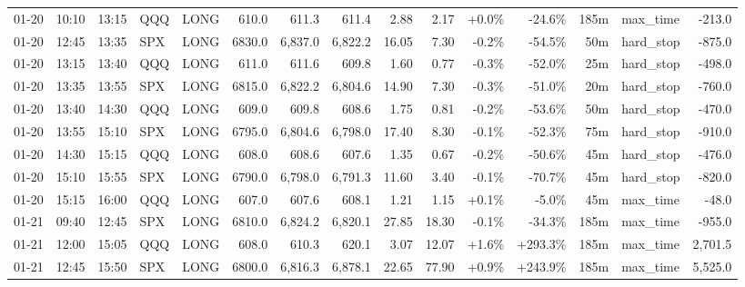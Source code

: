 \documentclass[11pt,a4paper,twoside]{article}
\begin{document}
\begin{landscape}
\begin{center}
\begin{longtable}{>{\color{txtmain}}l l l l l r r r r r r r r >{\color{txtmain}}l r}
01-20 & 10:10 & 13:15 & QQQ & LONG & 610.0 & 611.3 & 611.4 & 2.88 & 2.17 & \textcolor{wingreen}{+0.0\%} & \textcolor{lossred}{-24.6\%} & 185m & max\_time & \textcolor{lossred}{-213.0} \\
01-20 & 12:45 & 13:35 & SPX & LONG & 6830.0 & 6,837.0 & 6,822.2 & 16.05 & 7.30 & \textcolor{lossred}{-0.2\%} & \textcolor{lossred}{-54.5\%} & 50m & hard\_stop & \textcolor{lossred}{-875.0} \\
01-20 & 13:15 & 13:40 & QQQ & LONG & 611.0 & 611.6 & 609.8 & 1.60 & 0.77 & \textcolor{lossred}{-0.3\%} & \textcolor{lossred}{-52.0\%} & 25m & hard\_stop & \textcolor{lossred}{-498.0} \\
01-20 & 13:35 & 13:55 & SPX & LONG & 6815.0 & 6,822.2 & 6,804.6 & 14.90 & 7.30 & \textcolor{lossred}{-0.3\%} & \textcolor{lossred}{-51.0\%} & 20m & hard\_stop & \textcolor{lossred}{-760.0} \\
01-20 & 13:40 & 14:30 & QQQ & LONG & 609.0 & 609.8 & 608.6 & 1.75 & 0.81 & \textcolor{lossred}{-0.2\%} & \textcolor{lossred}{-53.6\%} & 50m & hard\_stop & \textcolor{lossred}{-470.0} \\
01-20 & 13:55 & 15:10 & SPX & LONG & 6795.0 & 6,804.6 & 6,798.0 & 17.40 & 8.30 & \textcolor{lossred}{-0.1\%} & \textcolor{lossred}{-52.3\%} & 75m & hard\_stop & \textcolor{lossred}{-910.0} \\
01-20 & 14:30 & 15:15 & QQQ & LONG & 608.0 & 608.6 & 607.6 & 1.35 & 0.67 & \textcolor{lossred}{-0.2\%} & \textcolor{lossred}{-50.6\%} & 45m & hard\_stop & \textcolor{lossred}{-476.0} \\
01-20 & 15:10 & 15:55 & SPX & LONG & 6790.0 & 6,798.0 & 6,791.3 & 11.60 & 3.40 & \textcolor{lossred}{-0.1\%} & \textcolor{lossred}{-70.7\%} & 45m & hard\_stop & \textcolor{lossred}{-820.0} \\
01-20 & 15:15 & 16:00 & QQQ & LONG & 607.0 & 607.6 & 608.1 & 1.21 & 1.15 & \textcolor{wingreen}{+0.1\%} & \textcolor{lossred}{-5.0\%} & 45m & max\_time & \textcolor{lossred}{-48.0} \\
01-21 & 09:40 & 12:45 & SPX & LONG & 6810.0 & 6,824.2 & 6,820.1 & 27.85 & 18.30 & \textcolor{lossred}{-0.1\%} & \textcolor{lossred}{-34.3\%} & 185m & max\_time & \textcolor{lossred}{-955.0} \\
01-21 & 12:00 & 15:05 & QQQ & LONG & 608.0 & 610.3 & 620.1 & 3.07 & 12.07 & \textcolor{wingreen}{+1.6\%} & \textcolor{wingreen}{+293.3\%} & 185m & max\_time & \textcolor{wingreen}{2,701.5} \\
01-21 & 12:45 & 15:50 & SPX & LONG & 6800.0 & 6,816.3 & 6,878.1 & 22.65 & 77.90 & \textcolor{wingreen}{+0.9\%} & \textcolor{wingreen}{+243.9\%} & 185m & max\_time & \textcolor{wingreen}{5,525.0} \\

\end{longtable}
\end{center}
\end{landscape}
\end{document}
